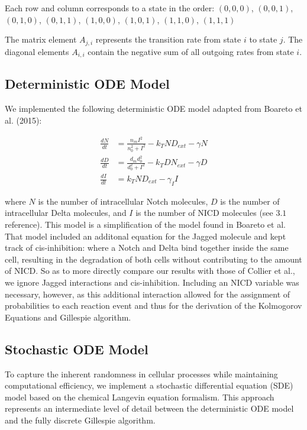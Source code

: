 \documentclass{article}
\begin{document}
\begin{flushleft}
Each row and column corresponds to a state in the order:
$(0,0,0)$, $(0,0,1)$, $(0,1,0)$, $(0,1,1)$, $(1,0,0)$, $(1,0,1)$, $(1,1,0)$, $(1,1,1)$

The matrix element $A_{j,i}$ represents the transition rate from state $i$ to state $j$. The diagonal elements $A_{i,i}$ contain the negative sum of all outgoing rates from state $i$.

\subsection{Deterministic ODE Model}

We implemented the following deterministic ODE model adapted from Boareto et al. (2015): 

$$
\begin{aligned}
  \frac{dN}{dt} &= \frac{n_{m}I^2}{n_{0}^2 + I^2} - k_{T}ND_{ext} - \gamma N \\[5pt]
  \frac{dD}{dt} &= \frac{d_{m}d_{0}^2}{d_{0}^2 + I^2} - k_{T}DN_{ext} - \gamma D \\[5pt]
  \frac{dI}{dt} &= k_{T}ND_{ext} - \gamma_{I}I
\end{aligned}
$$

where $N$ is the number of intracellular Notch molecules, $D$ is the number of intracellular Delta molecules, and $I$ is the number of NICD molecules (see $3.1$ reference). This model is a simplification of the model found in Boareto et al. That model included an additonal equation for the Jagged molecule and kept track of cis-inhibition: where a Notch and Delta bind together inside the same cell, resulting in the degradation of both cells without contributing to the amount of NICD. So as to more directly compare our results with those of Collier et al., we ignore Jagged interactions and cis-inhibition. Including an NICD variable was necessary, however, as this additional interaction allowed for the assignment of probabilities to each reaction event and thus for the derivation of the Kolmogorov Equations and Gillespie algorithm.

\subsection{Stochastic ODE Model}

To capture the inherent randomness in cellular processes while maintaining computational efficiency, we implement a stochastic differential equation (SDE) model based on the chemical Langevin equation formalism. This approach represents an intermediate level of detail between the deterministic ODE model and the fully discrete Gillespie algorithm.


\end{flushleft}
\end{document}
